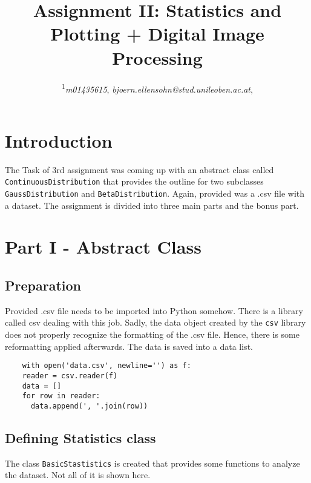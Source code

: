 \documentclass{CPSReport}
\title{Assignment II: Statistics and Plotting + Digital Image Processing} %
\author{
	\coursetitle{Introduction to Machine Learning Lab (190.013), SS2023}
	\authorstyle{Björn Ellensohn\textsuperscript{1}} %
	\newline\newline %
	\textsuperscript{1}\textit{m01435615}, \textit{bjoern.ellensohn@stud.unileoben.ac.at}, \institution{Montanuniversität Leoben, Austria}\\ %
	\submissiondate{\today} %
}
\begin{document}
\maketitle %

\thispagestyle{firstpage} %



\section{Introduction}
The Task of 3rd assignment was coming up with an abstract class called \texttt{ContinuousDistribution} that provides the outline for two subclasses \texttt{GaussDistribution} and \texttt{BetaDistribution}.
Again, provided was a .csv file with a dataset.
The assignment is divided into three main parts and the bonus part.

\section{Part I - Abstract Class}
\subsection{Preparation}
Provided .csv file needs to be imported into Python somehow. There is a library called csv dealing with this job. Sadly, the data object created by the \texttt{csv} library does not properly recognize the formatting of the .csv file. Hence, there is some reformatting applied afterwards.
The data is saved into a data list.

\begin{verbatim}
    with open('data.csv', newline='') as f:
    reader = csv.reader(f)
    data = []
    for row in reader:
      data.append(', '.join(row))
\end{verbatim}

\subsection{Defining Statistics class}
The class \texttt{BasicStastistics} is created that provides some functions to analyze the dataset. Not all of it is shown here.
\end{document}
